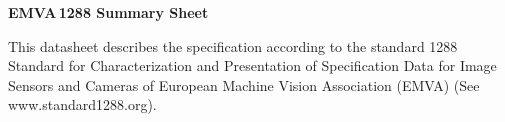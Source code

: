 \documentclass[a4paper,twoside,12pt,american,hidelinks]{article}
\title{}
\author{}
\date{}
\begin{document}
\newcommand{\TheReportSection}{}
\newcommand{\ReportSection}[1]{\renewcommand{\TheReportSection}{#1}}

\newsavebox\wtmkbox
\savebox\wtmkbox{\tikz[color=red,opacity=0.3]\node{%
\newwatermark*[
allpages, angle=45.0, scale=8.0, xpos=-20, ypos=15
]{\usebox\wtmkbox}

}}

\ReportSection{EMVA\,1288 Summary Sheet}
\pagestyle{fancy}
\scriptsize
\textbf{EMVA\,1288 Summary Sheet}
\vspace*{5mm}

\begin{minipage}[t]{0.975\linewidth}
This datasheet describes the specification according to the standard 1288
Standard for Characterization and Presentation of Specification Data for
Image Sensors and Cameras of European Machine Vision Association (EMVA)
(See www.standard1288.org).
\end{minipage}
\vspace*{5mm}

\end{document}
